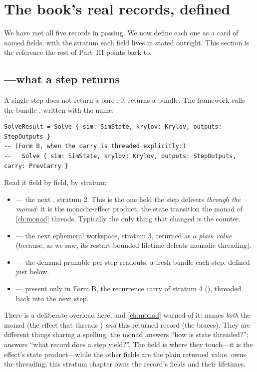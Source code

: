 \section{The book's real records, defined}

We have met all five records in passing. We now define each one as a card of
named fields, with the stratum each field lives in stated outright. This section
is the reference the rest of Part~III points back to.

\subsection{\texorpdfstring{}{SolveResult}---what a step returns}

A single step does not return a bare ; it returns a bundle. The
framework calls the bundle , written with the 
name:

\begin{lstlisting}[style=l4style]
SolveResult = Solve { sim: SimState, krylov: Krylov, outputs: StepOutputs }
-- (Form B, when the carry is threaded explicitly:)
--   Solve { sim: SimState, krylov: Krylov, outputs: StepOutputs, carry: PrevCarry }
\end{lstlisting}

Read it field by field, by stratum:

\begin{itemize}[nosep]
  \item {} --- the next , stratum 2. This is the one field
  the step delivers \emph{through the monad}: it is the monadic-effect product,
  the state transition the  monad of \cref{ch:monad} threads.
  Typically the only thing that changed is the  counter.
  \item {} --- the next ephemeral workspace, stratum 3, returned as a
  \emph{plain value} (because, as we saw, its restart-bounded lifetime defeats
  monadic threading).
  \item {} --- the demand-prunable per-step readouts, a fresh bundle
  each step; defined just below.
  \item {} --- present only in Form B, the recurrence carry of stratum
  4 (), threaded back into the next step.
\end{itemize}

There is a deliberate overload here, and \cref{ch:monad} warned of it:
 names \emph{both} the monad (the effect that threads )
\emph{and} this returned record (the braces). They are different things sharing a
spelling: the monad answers ``how is state threaded?''; 
answers ``what record does a step yield?''. The  field is where they
touch---it is the effect's state product---while the other fields are the plain
returned value.  owns the threading; this stratum chapter owns the
record's fields and their lifetimes.

